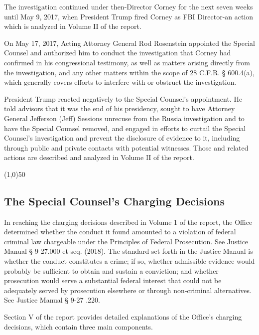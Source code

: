\documentclass{article}
\newcommand{\hr}{\begin{center} \line(1,0){50} \end{center}}
\begin{document}
The investigation continued under then-Director Corney for the next seven weeks until May 9, 2017, when President Trump fired Corney as FBI Director-an action which is analyzed in Volume II of the report.

On May 17, 2017, Acting Attorney General Rod Rosenstein appointed the Special Counsel and authorized him to conduct the investigation that Corney had confirmed in his congressional testimony, as well as matters arising directly from the investigation, and any other matters within the scope of 28 C.F.R. § 600.4(a), which generally covers efforts to interfere with or obstruct the investigation.

President Trump reacted negatively to the Special Counsel's appointment. He told advisors that it was the end of his presidency, sought to have Attorney General Jefferson (Jeff) Sessions unrecuse from the Russia investigation and to have the Special Counsel removed, and engaged in efforts to curtail the Special Counsel's investigation and prevent the disclosure of evidence to it, including through public and private contacts with potential witnesses. Those and related actions are described and analyzed in Volume II of the report.

\hr

\subsection{The Special Counsel's Charging Decisions}

In reaching the charging decisions described in Volume 1  of the report, the Office determined whether the conduct it found amounted to a violation of federal criminal law chargeable under the Principles of Federal Prosecution. See Justice Manual § 9-27.000 et seq. (2018). The standard set forth in the Justice Manual is whether the conduct constitutes a crime; if so, whether admissible evidence would probably be sufficient to obtain and sustain a  conviction; and whether prosecution would serve a  substantial federal interest that could not be adequately served by prosecution elsewhere or through non-criminal alternatives. See Justice Manual § 9-27 .220.

Section V of the report provides detailed explanations of the Office's charging decisions, which contain three main components.
\end{document}
